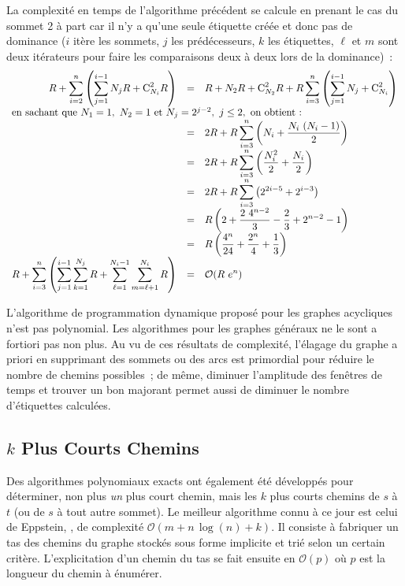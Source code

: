 \documentclass[10pt,francais]{llncs}
\begin{document}
La complexit\'e en temps de l'algorithme pr\'ec\'edent se calcule en prenant le cas du sommet 2 \`a part car il n'y a qu'une seule \'etiquette cr\'e\'ee et donc pas de dominance ($i$ it\`ere les sommets, $j$ les pr\'ed\'ecesseurs, $k$ les \'etiquettes, $\ell$ et $m$ sont deux it\'erateurs pour faire les comparaisons deux \`a deux lors de la dominance)~:
$$
\begin{array}{rcl}
  \displaystyle R + \sum_{i=2}^n \left(\sum_{j=1}^{i-1} N_j R + \textrm{C}^2_{N_i} R \right)
  	& = & 
  	\displaystyle R + N_2 R + \textrm{C}^2_{N_2} R + R \sum_{i=3}^n \left(\sum_{j=1}^{i-1} N_j + \textrm{C}^2_{N_i}\right) \\
  \multicolumn{3}{l}{\textrm{en sachant que }N_1 = 1,\ N_2 = 1 \textrm{ et } N_j = 2^{j-2},\ j\leq 2,\ \textrm{on obtient :}}\\
  & = & 
  	\displaystyle 2R + R \sum_{i=3}^n \left(N_i + \frac{N_i\ (N_i-1)}{2}\right) \\
  & = & 
  	\displaystyle 2R + R \sum_{i=3}^n \left(\frac{N_i^2}{2} + \frac{N_i}{2} \right) \\
  & = & 
  	\displaystyle 2R + R \sum_{i=3}^n \left(2^{2i-5} + 2^{i-3} \right) \\
  & = & 
  	\displaystyle R \left(2 + \frac{2\ 4^{n-2}}{3} - \frac{2}{3} + 2^{n-2} - 1 \right)\\
 & = & 
  	\displaystyle R \left(\frac{4^n}{24} + \frac{2^n}{4} + \frac{1}{3} \right)\\
  \displaystyle R + \sum_{i=3}^n \left(\sum_{j=1}^{i-1} \sum_{k=1}^{N_j} R + \sum_{\ell=1}^{N_i-1}\sum_{m=\ell+1}^{N_i} R \right)
  	& = & 
  	\displaystyle \mathcal{O}(R\ e^n)\\
\end{array}
$$

L'algorithme de programmation dynamique propos\'e pour les graphes acycliques n'est pas polynomial. Les algorithmes pour les graphes g\'en\'eraux ne le sont a fortiori pas non plus. Au vu de ces r\'esultats de complexit\'e, l'\'elagage du graphe a priori en supprimant des sommets ou des arcs est primordial pour r\'eduire le nombre de chemins possibles~; de m\^eme, diminuer l'amplitude des fen\^etres de temps et trouver un bon majorant permet aussi de diminuer le nombre d'\'etiquettes calcul\'ees.

\subsection{$k$ Plus Courts Chemins}\label{sub-resol-kpcc}
Des algorithmes polynomiaux exacts ont \'egalement \'et\'e d\'evelopp\'es pour d\'eterminer, non plus {\em un} plus court chemin, mais les $k$ plus courts chemins de $s$ \`a $t$ (ou de $s$ \`a tout autre sommet). Le meilleur algorithme connu \`a ce jour est celui de Eppstein, \cite{Eppstein1998}, de complexit\'e $\mathcal{O}(m + n\, \log(n) + k)$. Il consiste \`a fabriquer un tas des chemins du graphe stock\'es sous forme implicite et tri\'e selon un certain crit\`ere. L'explicitation d'un chemin du tas se fait ensuite en $\mathcal{O}(p)$ o\`u $p$ est la longueur du chemin \`a \'enum\'erer.
\end{document}
